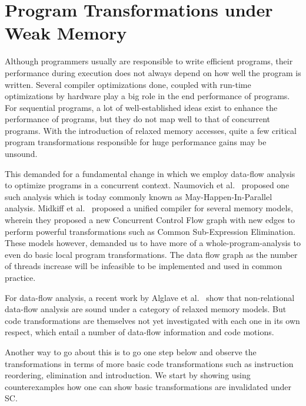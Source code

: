 \section{Program Transformations under Weak Memory}

    Although programmers usually are responsible to write efficient programs, their performance during execution does not always depend on how well the program is written. 
    Several compiler optimizations done, coupled with run-time optimizations by hardware play a big role in the end performance of programs.
    For sequential programs, a lot of well-established ideas exist to enhance the performance of programs, but they do not map well to that of concurrent programs. 
    With the introduction of relaxed memory accesses, quite a few critical program transformations responsible for huge performance gains may be unsound. 

    This demanded for a fundamental change in which we employ data-flow analysis to optimize programs in a concurrent context. Naumovich et al.~\cite{NaumovichA} proposed one such analysis which is today commonly known as May-Happen-In-Parallel analysis. 
    Midkiff et al.~\cite{Midkiff} proposed a unified compiler for several memory models, wherein they proposed a new Concurrent Control Flow graph with new edges to perform powerful transformations such as Common Sub-Expression Elimination. 
    These models however, demanded us to have more of a whole-program-analysis to even do basic local program transformations. 
    The data flow graph as the number of threads increase will be infeasible to be implemented and used in common practice. 
   
    For data-flow analysis, a recent work by Alglave et al.~\cite{Alglave2} show that non-relational data-flow analysis are sound under a category of relaxed memory models. 
    But code transformations are themselves not yet investigated with each one in its own respect, which entail a number of data-flow information and code motions.
    
    Another way to go about this is to go one step below and observe the transformations in terms of more basic code transformations such as instruction reordering, elimination and introduction.   
    We start by showing using counterexamples how one can show basic transformations are invalidated under SC.

